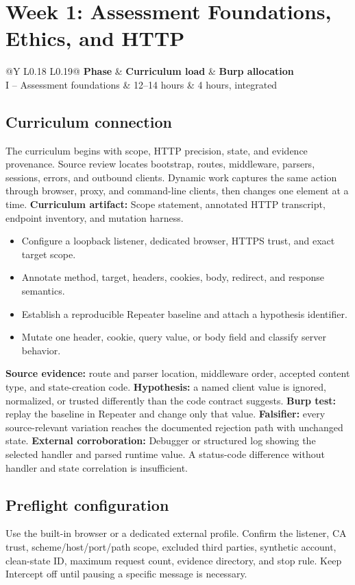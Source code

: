 \documentclass[11pt]{article}
\makeatletter
\newcommand{\weekheader}[5]{%
  \clearpage
  \section{Week #1: #2}
  \begin{tcolorbox}[colback=Navy,colframe=Navy,coltext=white]
    \begin{tabularx}{\linewidth}{@{}Y L{0.18\linewidth} L{0.19\linewidth}@{}}
      \textbf{Phase} & \textbf{Curriculum load} & \textbf{Burp allocation}\\
      #3 & #4 hours & #5 hours, integrated
    \end{tabularx}
  \end{tcolorbox}
}
\newcommand{\weekfield}[2]{%
  \Needspace{5\baselineskip}
  \subsection*{#1}
  #2
}
\newcommand{\curriculumartifact}[1]{\textbf{Curriculum artifact:} #1}
\newcommand{\externalproof}[1]{\textbf{External corroboration:} #1}
\makeatother
\begin{document}
\weekheader{1}{Assessment Foundations, Ethics, and HTTP}{I -- Assessment foundations}{12--14}{4}

\weekfield{Curriculum connection}{The curriculum begins with scope, HTTP
precision, state, and evidence provenance. Source review locates bootstrap,
routes, middleware, parsers, sessions, errors, and outbound clients. Dynamic
work captures the same action through browser, proxy, and command-line clients,
then changes one element at a time. \curriculumartifact{Scope statement,
annotated HTTP transcript, endpoint inventory, and mutation harness.}}

\begin{objectivebox}
\begin{itemize}
  \item Configure a loopback listener, dedicated browser, HTTPS trust, and exact target scope.
  \item Annotate method, target, headers, cookies, body, redirect, and response semantics.
  \item Establish a reproducible Repeater baseline and attach a hypothesis identifier.
  \item Mutate one header, cookie, query value, or body field and classify server behavior.
\end{itemize}
\end{objectivebox}

\begin{bridgebox}
\textbf{Source evidence:} route and parser location, middleware order, accepted
content type, and state-creation code. \textbf{Hypothesis:} a named client value
is ignored, normalized, or trusted differently than the code contract suggests.
\textbf{Burp test:} replay the baseline in Repeater and change only that value.
\textbf{Falsifier:} every source-relevant variation reaches the documented
rejection path with unchanged state. \externalproof{Debugger or structured log
showing the selected handler and parsed runtime value.} A status-code difference
without handler and state correlation is insufficient.
\end{bridgebox}

\weekfield{Preflight configuration}{Use the built-in browser or a dedicated
external profile. Confirm the listener, CA trust, scheme/host/port/path scope,
excluded third parties, synthetic account, clean-state ID, maximum request count,
evidence directory, and stop rule. Keep Intercept off until pausing a specific
message is necessary.}
\end{document}
